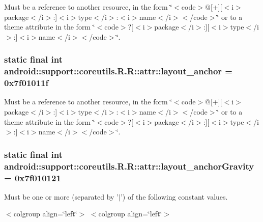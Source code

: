 Must be a reference to another resource, in the form \char`\"{}$<$code$>$@\mbox{[}+\mbox{]}\mbox{[}$<$i$>$package$<$/i$>$:\mbox{]}$<$i$>$type$<$/i$>$:$<$i$>$name$<$/i$>$$<$/code$>$\char`\"{} or to a theme attribute in the form \char`\"{}$<$code$>$?\mbox{[}$<$i$>$package$<$/i$>$:\mbox{]}\mbox{[}$<$i$>$type$<$/i$>$:\mbox{]}$<$i$>$name$<$/i$>$$<$/code$>$\char`\"{}. \hypertarget{classandroid_1_1support_1_1coreutils_1_1_r_1_1attr_fadefde7cbf1880326fbee6b8cd3b700}{
\subsubsection[{layout\_\-anchor}]{\setlength{\rightskip}{0pt plus 5cm}static final int android::support::coreutils.R.R::attr::layout\_\-anchor = 0x7f01011f}}
\label{classandroid_1_1support_1_1coreutils_1_1_r_1_1attr_fadefde7cbf1880326fbee6b8cd3b700}


Must be a reference to another resource, in the form \char`\"{}$<$code$>$@\mbox{[}+\mbox{]}\mbox{[}$<$i$>$package$<$/i$>$:\mbox{]}$<$i$>$type$<$/i$>$:$<$i$>$name$<$/i$>$$<$/code$>$\char`\"{} or to a theme attribute in the form \char`\"{}$<$code$>$?\mbox{[}$<$i$>$package$<$/i$>$:\mbox{]}\mbox{[}$<$i$>$type$<$/i$>$:\mbox{]}$<$i$>$name$<$/i$>$$<$/code$>$\char`\"{}. \hypertarget{classandroid_1_1support_1_1coreutils_1_1_r_1_1attr_83a7f0ba8cfc0818c96cf10b3d1a82c6}{
\subsubsection[{layout\_\-anchorGravity}]{\setlength{\rightskip}{0pt plus 5cm}static final int android::support::coreutils.R.R::attr::layout\_\-anchorGravity = 0x7f010121}}
\label{classandroid_1_1support_1_1coreutils_1_1_r_1_1attr_83a7f0ba8cfc0818c96cf10b3d1a82c6}


Must be one or more (separated by '$|$') of the following constant values. \begin{TabularC}{0}
\hline
\end{TabularC}
$<$colgroup align=\char`\"{}left\char`\"{}$>$ $<$colgroup align=\char`\"{}left\char`\"{}$>$ 

